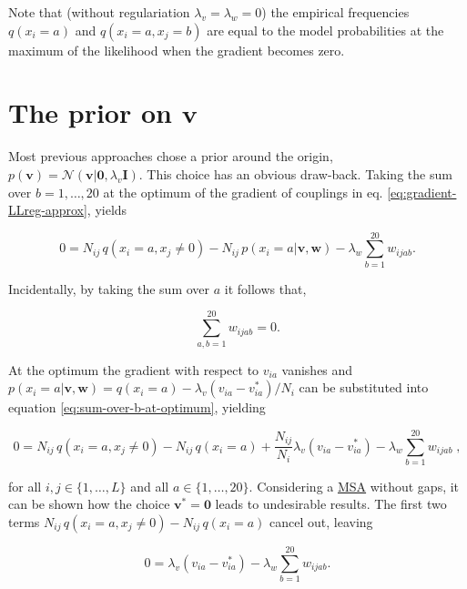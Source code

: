 \documentclass[12pt,a4paper,twoside]{book}
\newcommand{\eq}{\!=\!}
\newcommand{\Gauss}{\mathcal{N}}
\newcommand{\I}{\mathbf{I}}
\renewcommand{\v}{\mathbf{v}}
\newcommand{\via}{v_{ia}}
\newcommand{\w}{\mathbf{w}}
\newcommand{\wijab}{w_{ijab}}
\theoremstyle{definition}
\theoremstyle{definition}
\theoremstyle{remark}
\begin{document}
Note that (without regulariation \(\lambda_v = \lambda_w = 0\)) the
empirical frequencies \(q(x_i \eq a)\) and \(q(x_i \eq a, x_j=b)\) are
equal to the model probabilities at the maximum of the likelihood when
the gradient becomes zero.

\section{\texorpdfstring{The prior on
\(\v\)}{The prior on \textbackslash{}v}}\label{prior-v}

Most previous approaches chose a prior around the origin,
\(p(\v) = \Gauss ( \v| \mathbf{0}, \lambda_v \I)\). This choice has an
obvious draw-back. Taking the sum over \(b=1,\ldots, 20\) at the optimum
of the gradient of couplings in eq. \eqref{eq:gradient-LLreg-approx},
yields

\begin{equation}
    0 =   N_{ij}\, q(x_i \eq a, x_j \ne 0)   - N_{ij}\, p(x_i \eq a | \v, \w)  - \lambda_w \sum_{b=1}^{20} \wijab.
    \label{eq:sum-over-b-at-optimum}
\end{equation}

Incidentally, by taking the sum over \(a\) it follows that,

\begin{equation}
    \sum_{a,b=1}^{20} \wijab  = 0.
\label{eq:zero-sum-wij}
\end{equation}

At the optimum the gradient with respect to \(\via\) vanishes and
\(p(x_i=a|\v,\w) = q(x_i=a) - \lambda_v (\via - \via^*) / N_i\) can be
substituted into equation \eqref{eq:sum-over-b-at-optimum}, yielding

\begin{equation}
    0 =  N_{ij} \, q(x_i \eq a, x_j \ne 0)  - N_{ij} \, q(x_i=a) + \frac{N_{ij}}{N_i}\lambda_v (\via - \via^*)  - \lambda_w \sum_{b=1}^{20} \wijab \; ,
\label{eq:gauge-opt-1}
\end{equation}

for all \(i,j \in \{1,\ldots,L\}\) and all \(a \in \{1,\ldots,20\}\).
Considering a \protect\hyperlink{abbrev}{MSA} without gaps, it can be
shown how the choice \(\v^*= \mathbf{0}\) leads to undesirable results.
The first two terms
\(N_{ij} \, q(x_i \eq a, x_j \ne 0) - N_{ij} \, q(x_i=a)\) cancel out,
leaving

\begin{equation}
    0 =  \lambda_v (\via - \via^*)  - \lambda_w \sum_{b=1}^{20} \wijab .
\label{eq:gauge-opt-2}
\end{equation}
\end{document}
